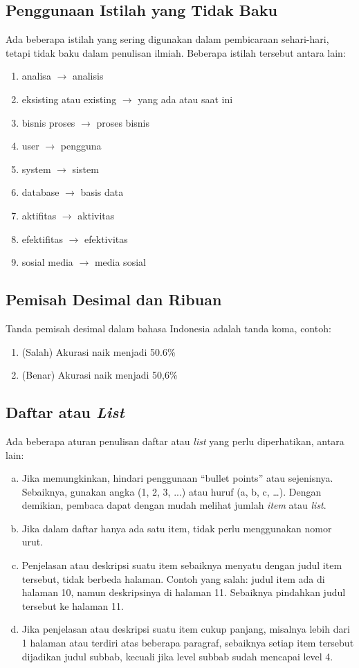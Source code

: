 \subsection{Penggunaan Istilah yang Tidak Baku}
Ada beberapa istilah yang sering digunakan dalam pembicaraan sehari-hari, tetapi tidak baku dalam penulisan ilmiah.
Beberapa istilah tersebut antara lain:
\begin{enumerate}
  \item analisa $\rightarrow$ analisis
  \item eksisting atau existing $\rightarrow$ yang ada atau saat ini
  \item bisnis proses $\rightarrow$ proses bisnis
  \item user $\rightarrow$ pengguna
  \item system $\rightarrow$ sistem
  \item database $\rightarrow$ basis data
  \item aktifitas $\rightarrow$ aktivitas
  \item efektifitas $\rightarrow$ efektivitas
  \item sosial media $\rightarrow$ media sosial
\end{enumerate}

\subsection{Pemisah Desimal dan Ribuan}
Tanda pemisah desimal dalam bahasa Indonesia adalah tanda koma, contoh:
\begin{enumerate}
  \item (Salah) Akurasi naik menjadi 50.6\% 
  \item (Benar) Akurasi naik menjadi 50,6\% 
\end{enumerate}

\subsection{Daftar atau \textit{List}}
Ada beberapa aturan penulisan daftar atau \textit{list} yang perlu diperhatikan, antara lain:
\begin{enumerate}[a)]
\item Jika memungkinkan, hindari penggunaan “bullet points” atau sejenisnya. Sebaiknya, gunakan angka (1, 2, 3, ...) atau huruf (a, b, c, …). Dengan demikian, pembaca dapat dengan mudah melihat jumlah \textit{item} atau \textit{list}. 
\item Jika dalam daftar hanya ada satu item, tidak perlu menggunakan nomor urut.
\item Penjelasan atau deskripsi suatu item sebaiknya menyatu dengan judul item tersebut, tidak berbeda halaman. Contoh yang salah: judul item ada di halaman 10, namun deskripsinya di halaman 11. Sebaiknya pindahkan judul tersebut ke halaman 11.
\item Jika penjelasan atau deskripsi suatu item cukup panjang, misalnya lebih dari 1 halaman atau terdiri atas beberapa paragraf, sebaiknya setiap item tersebut dijadikan judul subbab, kecuali jika level subbab sudah mencapai level 4. 
\end{enumerate}

